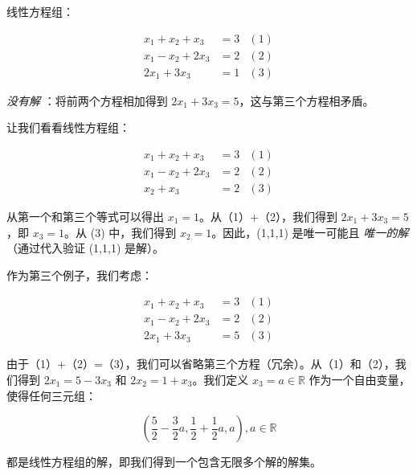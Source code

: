 \begin{notebox}
线性方程组：

\begin{equation}
\begin{array}{clr}
  x_1 + x_2 + x_3 & = 3 &(1)\\
  x_1 - x_2 + 2x_3 & = 2 &(2)\\
  2x_1 + 3x_3 & = 1 &(3)
\end{array}
\tag{2.4}\label{eq:2-4}
\end{equation}

\emph{没有解} ：将前两个方程相加得到 $ 2x_1 + 3x_3 = 5 $，这与第三个方程相矛盾。
\end{notebox}

\begin{notebox}
让我们看看线性方程组：

\begin{equation}
\begin{array}{clr}
  x_1 + x_2 + x_3 & = 3 &(1)\\
  x_1 - x_2 + 2x_3 & = 2 &(2)\\
  x_2 + x_3 & = 2 &(3)
\end{array}
\tag{2.5}\label{eq:2-5}
\end{equation}

从第一个和第三个等式可以得出 $ x_1 = 1 $。从（1）+（2），我们得到 $ 2x_1 + 3x_3 = 5 $，即 $ x_3 = 1 $。从 (3) 中，我们得到 $ x_2 = 1 $。因此，(1,1,1) 是唯一可能且 \emph{唯一的解} （通过代入验证 (1,1,1) 是解）。
\end{notebox}

\begin{notebox}
作为第三个例子，我们考虑：

\begin{equation}
\begin{array}{clr}
  x_1 + x_2 + x_3 & = 3 &(1)\\
  x_1 - x_2 + 2x_3 & = 2 &(2)\\
  2x_1 + 3x_3 & = 5 &(3)
\end{array}
\tag{2.6}\label{eq:2-6}
\end{equation}

由于（1）+（2）=（3），我们可以省略第三个方程（冗余）。从（1）和（2），我们得到 $ 2x_1 = 5 - 3x_3 $ 和 $ 2x_2 = 1 + x_3 $。我们定义 $ x_3 = a \in \mathbb{R} $ 作为一个自由变量，使得任何三元组：

\begin{equation}
\left( \frac{5}{2} - \frac{3}{2}a, \frac{1}{2} + \frac{1}{2}a, a \right), a \in \mathbb{R}
\tag{2.7}\label{eq:2-7}
\end{equation}

都是线性方程组的解，即我们得到一个包含无限多个解的解集。
\end{notebox}


